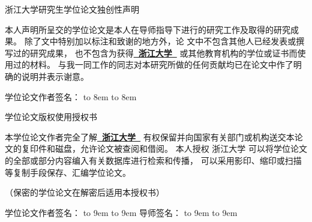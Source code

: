   \vspace*{-2mm}

  {\songti

  \begin{center}
    {\noindent\songti{}浙江大学研究生学位论文独创性声明}\\
  \end{center}

  {\setlength{\baselineskip}{1.3\baselineskip}
  本人声明所呈交的学位论文是本人在导师指导下进行的研究工作及取得的研究成果。
  除了文中特别加以标注和致谢的地方外，论
  文中不包含其他人已经发表或撰写过的研究成果，
  也不包含为获得{\bfseries\kaishu{}\underline{~浙江大学~}}
  或其他教育机构的学位或证书而使用过的材料。
  与我一同工作的同志对本研究所做的任何贡献均已在论文中作了明确的说明并表示谢意。

  \vspace{10ex}

  {\songti{}学位论文作者签名：
  \ifpdf
  {\hbox to 8em{}}
  \else
  {\hbox to 8em{}}
  \fi
  \PutsigndateA}
  
  \vspace{12ex}

  \begin{center}
    {\noindent\songti{}学位论文版权使用授权书}
  \end{center}

  本学位论文作者完全了解{\bfseries\kaishu{}\underline{~浙江大学~}}
  有权保留并向国家有关部门或机构送交本论文的复印件和磁盘，允许论文被查阅和借阅。
  本人授权 浙江大学 可以将学位论文的全部或部分内容编入有关数据库进行检索和传播，
  可以采用影印、缩印或扫描等复制手段保存、汇编学位论文。

  （保密的学位论文在解密后适用本授权书）

  \vspace{2ex}

  学位论文作者签名：
  \ifpdf
  {\hbox to 9em{}}
  \else
  {\hbox to 9em{}}
  \fi
  导师签名：
  \ifpdf
  {\hbox to 9em{}}
  \else
  {\hbox to 9em{}}
  \fi

  \vspace{2ex}

  \PutsigndateB
  \hspace{3em}
  \PutsigndateC}
  }
